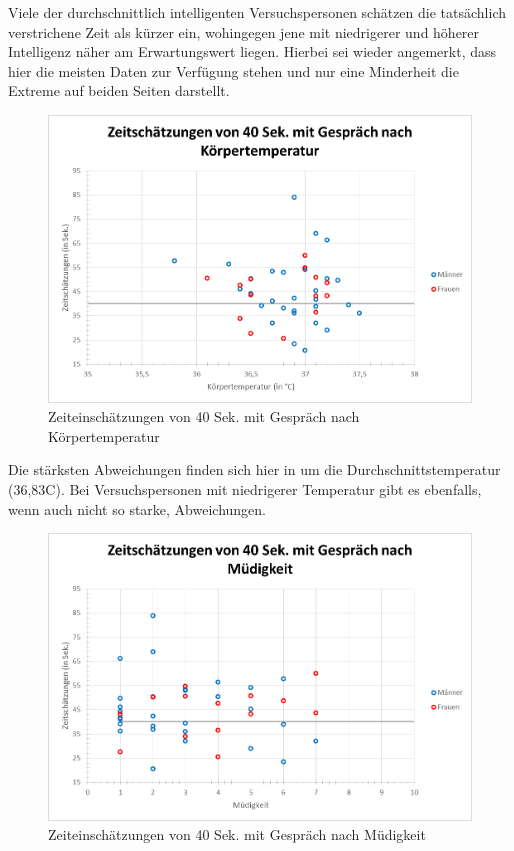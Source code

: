 \documentclass{Paper}
\begin{document}
Viele der durchschnittlich intelligenten Versuchspersonen schätzen die tatsächlich verstrichene Zeit als kürzer ein, wohingegen jene mit niedrigerer und höherer Intelligenz näher am Erwartungswert liegen. Hierbei sei wieder angemerkt, dass hier die meisten Daten zur Verfügung stehen und nur eine Minderheit die Extreme auf beiden Seiten darstellt.

\begin{figure}[H]
	\centering
	\includegraphics[scale=0.7]{../Diagramme/scatterPre/40mit_koerpertemperatur.png}
	\caption{Zeiteinschätzungen von 40 Sek. mit Gespräch nach Körpertemperatur}
	\label{img:temp40mit}
\end{figure}

Die stärksten Abweichungen finden sich hier in um die Durchschnittstemperatur (36,83\textdegree C).  Bei Versuchspersonen mit niedrigerer Temperatur gibt es ebenfalls, wenn auch nicht so starke, Abweichungen.





\begin{figure}[H]
	\centering
	\includegraphics[scale=0.7]{../Diagramme/scatterPre/40mit_muedigkeit.png}
	\caption{Zeiteinschätzungen von 40 Sek. mit Gespräch nach Müdigkeit}
	\label{img:mued40mit}
\end{figure}
\end{document}
